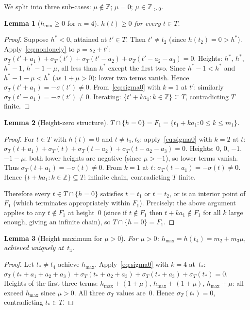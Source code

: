 \documentclass{article}
\newtheorem{lemma}{Lemma}
\begin{document}
We split into three sub-cases: $\mu\notin\mathbb{Z}$; $\mu=0$; $\mu\in\mathbb{Z}_{>0}$.

\begin{lemma}[$h_{\min}\ge 0$ for $n=4$]\label{lem:betamin4}
$h(t)\ge 0$ for every $t\in T$.
\end{lemma}
\begin{proof}
Suppose $h^*<0$, attained at $t'\in T$.  Then $t'\ne t_2$ (since $h(t_2)=0>h^*$).
Apply~\eqref{eq:nonlonely} to $p=s_2+t'$:
$\sigma_T(t'+a_1)+\sigma_T(t')+\sigma_T(t'-a_2)+\sigma_T(t'-a_2-a_3)=0$.
Heights: $h^*$, $h^*$, $h^*-1$, $h^*-1-\mu$, all less than $h^*$ except the first two.
Since $h^*-1<h^*$ and $h^*-1-\mu<h^*$ (as $1+\mu>0$): lower two terms vanish.
Hence $\sigma_T(t'+a_1)=-\sigma(t')\ne 0$.
From~\eqref{eq:sigma0} with $k=1$ at $t'$: similarly $\sigma_T(t'-a_1)=-\sigma(t')\ne 0$.
Iterating: $\{t'+ka_1:k\in\mathbb{Z}\}\subseteq T$, contradicting $T$ finite.
\end{proof}

\begin{lemma}[Height-zero structure]\label{lem:hzero}
$T\cap\{h=0\}=F_1=\{t_1+ka_1:0\le k\le m_1\}$.
\end{lemma}
\begin{proof}
For $t\in T$ with $h(t)=0$ and $t\ne t_1,t_2$:
apply~\eqref{eq:sigma0} with $k=2$ at $t$:
$\sigma_T(t+a_1)+\sigma_T(t)+\sigma_T(t-a_2)+\sigma_T(t-a_2-a_3)=0$.
Heights: $0$, $0$, $-1$, $-1-\mu$; both lower heights are negative (since $\mu>-1$),
so lower terms vanish.
Thus $\sigma_T(t+a_1)=-\sigma(t)\ne 0$.
From $k=1$ at $t$: $\sigma_T(t-a_1)=-\sigma(t)\ne 0$.
Hence $\{t+ka_1:k\in\mathbb{Z}\}\subseteq T$: infinite chain, contradicting $T$ finite.

Therefore every $t\in T\cap\{h=0\}$ satisfies $t=t_1$ or $t=t_2$, or is an interior point
of $F_1$ (which terminates appropriately within $F_1$).
Precisely: the above argument applies to any $t\notin F_1$ at height~$0$
(since if $t\notin F_1$ then $t+ka_1\notin F_1$ for all $k$ large enough, giving an infinite chain),
so $T\cap\{h=0\}=F_1$.
\end{proof}

\begin{lemma}[Height maximum for $\mu>0$]\label{lem:betamax4mu}
For $\mu>0$: $h_{\max}=h(t_4)=m_2+m_3\mu$, achieved uniquely at~$t_4$.
\end{lemma}
\begin{proof}
Let $t_*\ne t_4$ achieve $h_{\max}$.
Apply~\eqref{eq:sigma0} with $k=4$ at~$t_*$:
$\sigma_T(t_*+a_1+a_2+a_3)+\sigma_T(t_*+a_2+a_3)+\sigma_T(t_*+a_3)+\sigma_T(t_*)=0$.
Heights of the first three terms: $h_{\max}+(1+\mu)$, $h_{\max}+(1+\mu)$, $h_{\max}+\mu$:
all exceed $h_{\max}$ since $\mu>0$.  All three $\sigma_T$ values are~$0$.
Hence $\sigma_T(t_*)=0$, contradicting $t_*\in T$.
\end{proof}
\end{document}
